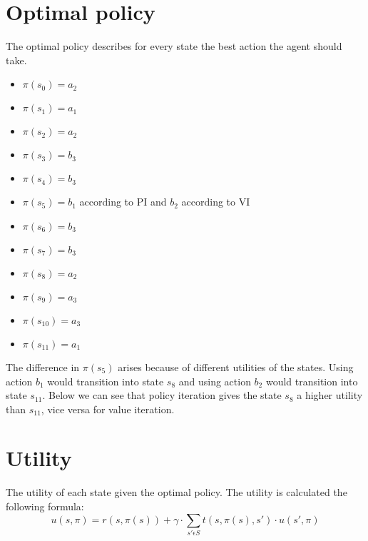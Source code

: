 \documentclass[a4paper]{article}
\begin{document}
\section{Optimal policy}
The optimal policy describes for every state the best action the agent should take.

\begin{multicols}{2}
\begin{itemize}
\item $\pi(s_{0}) = a_{2}$
\item $\pi(s_{1}) = a_{1}$
\item $\pi(s_{2}) = a_{2}$
\item $\pi(s_{3}) = b_{3}$
\item $\pi(s_{4}) = b_{3}$
\item $\pi(s_{5}) = b_{1}$ according to PI and $b_{2}$ according to VI
\item $\pi(s_{6}) = b_{3}$
\item $\pi(s_{7}) = b_{3}$
\item $\pi(s_{8}) = a_{2}$
\item $\pi(s_{9}) = a_{3}$
\item $\pi(s_{10}) = a_{3}$
\item $\pi(s_{11}) = a_{1}$
\end{itemize}
\end{multicols}

The difference in $\pi(s_5)$ arises because of different utilities of the states. Using action $b_1$ would transition into state $s_8$ and using action $b_2$ would transition into state $s_{11}$. Below we can see that policy iteration gives the state $s_8$ a higher utility than $s_{11}$, vice versa for value iteration.

\section{Utility}
The utility of each state given the optimal policy. The utility is calculated the following formula:
\begin{equation}
u(s,\pi) = r(s,\pi(s)) + \gamma \cdot \sum_{s' \epsilon S} t(s,\pi(s),s') \cdot u(s',\pi)
\end{equation}
\end{document}
